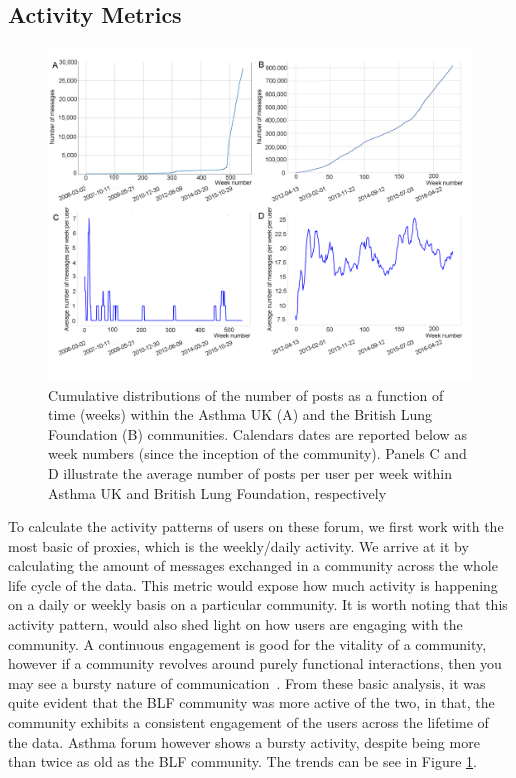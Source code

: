 \subsection{Activity Metrics}
\label{sec:activity}
\begin{figure}[!ht]
    \centering
    \includegraphics[width=\textwidth ]{Activity.png}
    \caption{Cumulative distributions of the number of posts as a function of time (weeks) within the Asthma UK (A) and the British Lung Foundation (B) communities. Calendars dates are reported below as week numbers (since the inception of the community). Panels C and D illustrate the average number of posts per user per week within Asthma UK and British Lung Foundation, respectively}        \label{fig:activity}
\end{figure}
To calculate the activity patterns of users on these forum, we first work with the most basic of proxies, which is the weekly/daily activity. We arrive at it by calculating the amount of messages exchanged in a community across the whole life cycle of the data. This metric would expose how much activity is happening on a daily or weekly basis on a particular community. It is worth noting that this activity pattern, would also shed light on how users are engaging with the community. A continuous engagement is good for the vitality of a community, however if a community revolves around purely functional interactions, then you may see a bursty nature of communication~\cite{panzarasa2015emergence}. From these basic analysis, it was quite evident that the BLF community was more active of the two, in that, the community exhibits a consistent engagement of the users across the lifetime of the data. Asthma forum however shows a bursty activity, despite being more than twice as old as the BLF community. The trends can be see in Figure \ref{fig:activity}.

